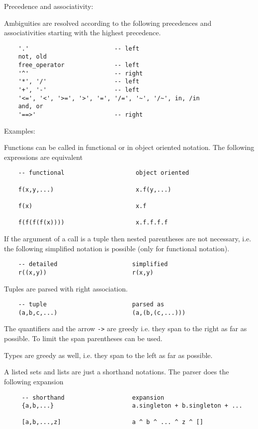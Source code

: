\noindent Precedence and associativity:

Ambiguities are resolved according to the following precedences and
associativities starting with the highest precedence.
\begin{lstlisting}
    '.'                        -- left
    not, old
    free_operator              -- left
    '^'                        -- right
    '*', '/'                   -- left
    '+', '-'                   -- left
    '<=', '<', '>=', '>', '=', '/=', '~', '/~', in, /in
    and, or
    '==>'                      -- right
\end{lstlisting}


\noindent Examples:

Functions can be called in functional or in object oriented notation. The
following expressions are equivalent

\begin{lstlisting}
    -- functional                    object oriented

    f(x,y,...)                       x.f(y,...)

    f(x)                             x.f

    f(f(f(f(x))))                    x.f.f.f.f
\end{lstlisting}

If the argument of a call is a tuple then nested parentheses are not
necessary, i.e. the following simplified notation is possible (only for
functional notation).

\begin{lstlisting}
    -- detailed                     simplified
    r((x,y))                        r(x,y)
\end{lstlisting}

Tuples are parsed with right association.
\begin{lstlisting}
    -- tuple                        parsed as
    (a,b,c,...)                     (a,(b,(c,...)))
\end{lstlisting}

The quantifiers and the arrow \lstinline!->! are greedy i.e. they span to the
right as far as possible. To limit the span parentheses can be used.

Types are greedy as well, i.e. they span to the left as far as possible.

A listed sets and lists are just a shorthand notations. The parser does the following
expansion

\begin{lstlisting}
     -- shorthand                   expansion
     {a,b,...}                      a.singleton + b.singleton + ...

     [a,b,...,z]                    a ^ b ^ ... ^ z ^ []
\end{lstlisting}



